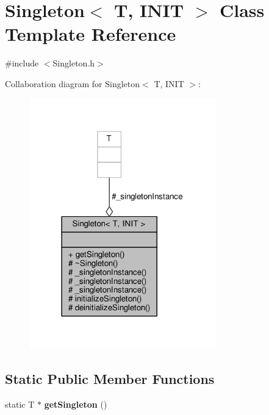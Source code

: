\hypertarget{classSingleton}{}\section{Singleton$<$ T, I\+N\+IT $>$ Class Template Reference}
\label{classSingleton}


{\ttfamily \#include $<$Singleton.\+h$>$}



Collaboration diagram for Singleton$<$ T, I\+N\+IT $>$\+:
\nopagebreak
\begin{figure}[H]
\begin{center}
\leavevmode
\includegraphics[width=230pt]{d1/db6/classSingleton__coll__graph}
\end{center}
\end{figure}
\subsection*{Static Public Member Functions}
\begin{DoxyCompactItemize}
\item 
static T $\ast$ {\bfseries get\+Singleton} ()\hypertarget{classSingleton_ad01798cf984712f902272857dd9a1472}{}\label{classSingleton_ad01798cf984712f902272857dd9a1472}

\end{DoxyCompactItemize}
